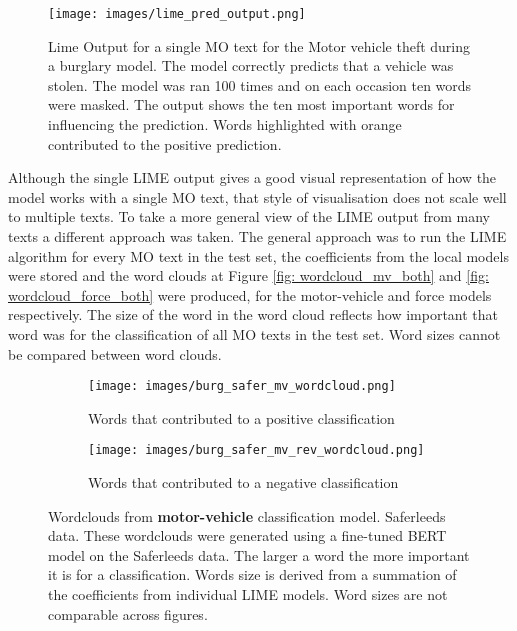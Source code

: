 \begin{figure}[!tbp]
  \centering
    \texttt{[image: images/lime\_pred\_output.png]}
    \caption{{Lime Output for a single MO text for the Motor vehicle theft during a burglary model.} The model correctly predicts that a vehicle was stolen. The model was ran 100 times and on each occasion ten words were masked. The output shows the ten most important words for influencing the prediction. Words highlighted with orange contributed to the positive prediction.}
    \label{fig:lime_out1}
\end{figure}



Although the single LIME output gives a good visual representation of how the model works with a single MO text, that style of visualisation does not scale well to multiple texts. To take a more general view of the LIME output from many texts a different approach was taken.   The general approach was to run the LIME algorithm for every MO text in the test set, the coefficients from the local models were stored and the word clouds at Figure \ref{fig: wordcloud_mv_both}  and \ref{fig: wordcloud_force_both} were produced, for the motor-vehicle and force models respectively. The size of the word in the word cloud reflects how important that word was for the classification of all MO texts in the test set. Word sizes cannot be compared between word clouds.  


\begin{figure}
     \centering
     \begin{subfigure}[b]{0.9\textwidth}
         \centering
         \texttt{[image: images/burg\_safer\_mv\_wordcloud.png]}
         \caption{Words that contributed to a positive classification}
         \label{fig: wordcloud_mv}
     \end{subfigure}
     \vfill
     \begin{subfigure}[b]{0.9\textwidth}
         \centering
         \texttt{[image: images/burg\_safer\_mv\_rev\_wordcloud.png]}
         \caption{Words that contributed to a negative classification}
         \label{fig: wordcloud_mv_rev}
     \end{subfigure}
        \caption{{Wordclouds from  \textbf{motor-vehicle} classification model. Saferleeds data.} These wordclouds were generated using a fine-tuned BERT model on the Saferleeds data. The larger a word the more important it is for a classification. Words size is derived from a summation of the coefficients from individual LIME models. Word sizes are not comparable across figures.}
        \label{fig:wordcloud_mv_both}
        
\end{figure}


